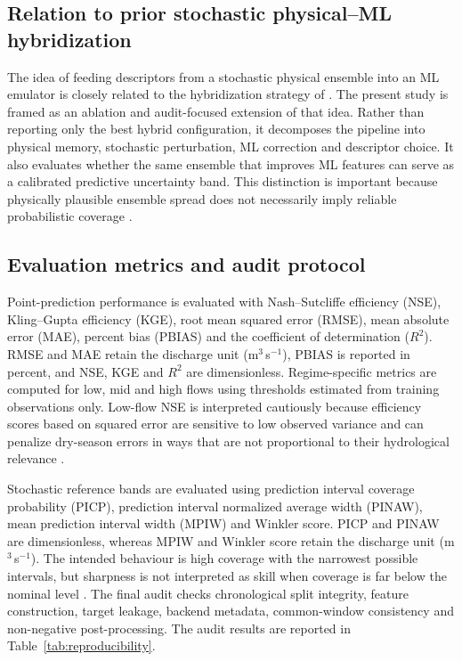 \documentclass[a4paper,fleqn]{cas-sc}
\newcommand{\cms}{m$^3$\,s$^{-1}$}
\begin{document}
\subsection{Relation to prior stochastic physical--ML hybridization}
\label{subsec:relation}

The idea of feeding descriptors from a stochastic physical ensemble into
an ML emulator is closely related to the hybridization strategy of
\citet{houenafa2025hybridization}. The present study is framed as an
ablation and audit-focused extension of that idea. Rather than reporting only
the best hybrid configuration, it decomposes the pipeline into physical
memory, stochastic perturbation, ML correction and descriptor choice. It
also evaluates whether the same ensemble that improves ML features can
serve as a calibrated predictive uncertainty band. This distinction is
important because physically plausible ensemble spread does not
necessarily imply reliable probabilistic coverage
\citep{atger1999skill,franz2011evaluating,papacharalampous2022review}.

\subsection{Evaluation metrics and audit protocol}\label{subsec:evaluation}

Point-prediction performance is evaluated with Nash--Sutcliffe
efficiency (NSE), Kling--Gupta efficiency (KGE), root mean squared error
(RMSE), mean absolute error (MAE), percent bias (PBIAS) and the
coefficient of determination ($R^2$). RMSE and MAE retain the discharge unit (\cms),
PBIAS is reported in percent, and NSE, KGE and $R^2$ are dimensionless. Regime-specific metrics are
computed for low, mid and high flows using thresholds estimated from
training observations only. Low-flow NSE is interpreted cautiously
because efficiency scores based on squared error are sensitive to low
observed variance and can penalize dry-season errors in ways that are
not proportional to their hydrological relevance
\citep{pushpalatha2012review}.

Stochastic reference bands are evaluated using prediction interval
coverage probability (PICP), prediction interval normalized average
width (PINAW), mean prediction interval width (MPIW) and Winkler score.
PICP and PINAW are dimensionless, whereas MPIW and Winkler score retain
the discharge unit (\cms).
The intended behaviour is high coverage with the narrowest possible
intervals, but sharpness is not interpreted as skill when coverage is
far below the nominal level \citep{franz2011evaluating,abaza2017incidence,papacharalampous2022review}.
The final audit checks chronological split integrity, feature
construction, target leakage, backend metadata, common-window
consistency and non-negative post-processing. The audit results are
reported in Table~\ref{tab:reproducibility}.
\end{document}
